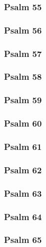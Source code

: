 \documentclass[10pt]{extarticle}
\begin{document}
\begin{multicols}{2}
\subsubsection{Psalm 55}

\newpage

\subsubsection{Psalm 56}

\newpage

\subsubsection{Psalm 57}

\newpage

\subsubsection{Psalm 58}

\newpage

\subsubsection{Psalm 59}

\newpage

\subsubsection{Psalm 60}

\newpage

\subsubsection{Psalm 61}

\newpage

\subsubsection{Psalm 62}

\newpage

\subsubsection{Psalm 63}

\newpage

\subsubsection{Psalm 64}

\newpage

\subsubsection{Psalm 65}

\newpage


\end{multicols}
\end{document}
